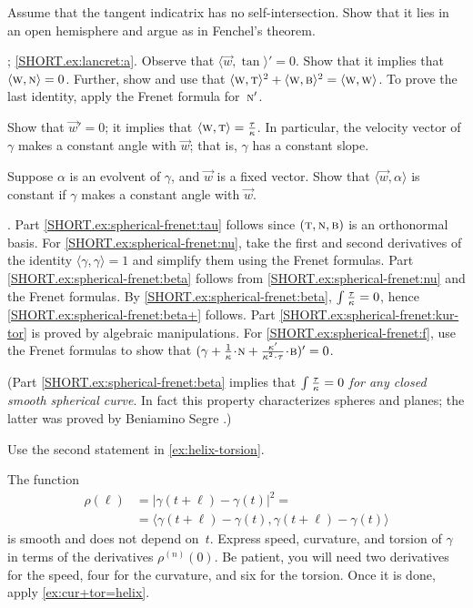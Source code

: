 \begin{multicols}{2}
 Assume that the tangent indicatrix has no self-intersection.
Show that it lies in an open hemisphere and argue as in Fenchel's theorem.

\parbf{\ref{ex:lancret}}; \ref{SHORT.ex:lancret:a}.
Observe that 
$\langle \vec w,\tan\rangle'=0$.
Show that it implies that $\langle \text{\sc{w}}, \text{\sc{n}}\rangle =0$.
Further, show and use that $\langle \text{\sc{w}}, \text{\sc{t}}\rangle^2+\langle \text{\sc{w}}, \text{\sc{b}}\rangle^2=\langle \text{\sc{w}}, \text{\sc{w}}\rangle$.
To prove the last identity, apply the Frenet formula for~$\text{\sc{n}}'$.

Show that $\vec w'=0$;
it implies that $\langle \vec w,\tan\rangle\z=\tfrac\tor\kur$.
In particular, the velocity vector of $\gamma$ makes a constant angle with $\vec w$; that is, $\gamma$ has a constant slope.

Suppose $\alpha$ is an evolvent of $\gamma$, and $\vec w$ is a fixed vector.
Show that $\langle \vec w,\alpha\rangle$ is constant if $\gamma$ makes a constant angle with $\vec w$.

\parbf{\ref{ex:spherical-frenet}}.
Part \ref{SHORT.ex:spherical-frenet:tau} follows since $(\text{\sc{t}},\text{\sc{n}},\text{\sc{b}})$ is an orthonormal basis.
For \ref{SHORT.ex:spherical-frenet:nu}, take the first and second derivatives of the identity $\langle\gamma,\gamma\rangle=1$ and simplify them using the Frenet formulas.
Part \ref{SHORT.ex:spherical-frenet:beta} follows from \ref{SHORT.ex:spherical-frenet:nu} and the Frenet formulas.
By \ref{SHORT.ex:spherical-frenet:beta}, $\int\tfrac{\tau}{\kappa}=0$, hence \ref{SHORT.ex:spherical-frenet:beta+} follows.
Part \ref{SHORT.ex:spherical-frenet:kur-tor} is proved by algebraic manipulations.
For \ref{SHORT.ex:spherical-frenet:f},
use the Frenet formulas to show that $(\gamma+\tfrac1\kur\cdot \norm+\tfrac{\kur'}{\kur^2\cdot\tor}\cdot\bi)'=0$.

(Part \ref{SHORT.ex:spherical-frenet:beta} implies that \textit{$\int\tfrac{\tau}{\kappa}=0$ for any closed smooth spherical curve}.
In fact this property characterizes spheres and planes; the latter was proved by Beniamino Segre \cite{segre}.)

 Use the second statement in \ref{ex:helix-torsion}.

 The function
\begin{align*}
\rho(\ell)&=|\gamma(t+\ell)-\gamma(t)|^2=
\\
&=\langle \gamma(t+\ell)-\gamma(t),\gamma(t+\ell)-\gamma(t)\rangle
\end{align*}
is smooth and does not depend on~$t$.
Express speed, curvature, and torsion of $\gamma$ in terms of the derivatives $\rho^{(n)}(0)$.
Be patient, you will need two derivatives for the speed,
four for the curvature,
and six for the torsion.
Once it is done, apply \ref{ex:cur+tor=helix}.


\end{multicols}
